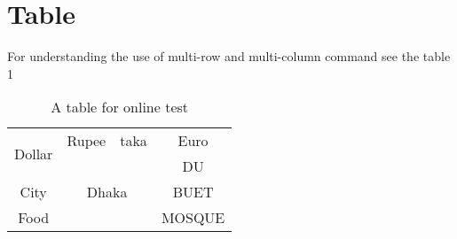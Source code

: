 \documentclass[14pt]{article}
\begin{document}
\section{Table}
For understanding the use of multi-row and multi-column command see the
table 1
\begin{table}[H]
    \centering
    \begin{tabular}{|c|c|c|c|}
       \hline
       \multirow{2}{*}{Dollar}  & Rupee & taka & Euro \\
	  \cline{2-4}
       & \multicolumn{2}{|c|}{\multirow{3}{*}{Dhaka}} & DU\\
	  \cline{4-4}
	  City & \multicolumn{2}{|c}{} & BUET\\
	  \cline{1-1}
	  \cline{4-4}
       Food & \multicolumn{2}{|c|}{} & MOSQUE\\
      \hline
    \end{tabular}
    \caption{  A table for online test}
\end{table}
\end{document}
